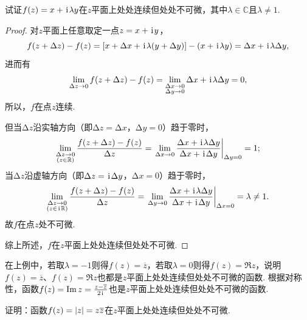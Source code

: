 \begin{example}
试证\(f(z)=x+\kern1pt\mathrm{i}\kern1pt \lambda y\)在\(z\)平面上处处连续但处处不可微，其中\(\lambda \in \mathbb{C}\)且\(\lambda \neq 1\).
\begin{proof}
对\(z\)平面上任意取定一点\(z=x+\kern1pt\mathrm{i}\kern1pt y\)，\begin{equation*}
f(z+\Delta z)-f(z) = [x + \Delta x + \kern1pt\mathrm{i}\kern1pt \lambda (y + \Delta y)] - (x + \kern1pt\mathrm{i}\kern1pt \lambda y) = \Delta x + \kern1pt\mathrm{i}\kern1pt \lambda \Delta y,
\end{equation*}进而有\begin{equation*}
\lim_{\Delta z\to0} f(z+\Delta z)-f(z)
= \lim_{\substack{\Delta x\to0 \\ \Delta y\to0}} \Delta x + \kern1pt\mathrm{i}\kern1pt \lambda \Delta y
= 0,
\end{equation*}所以，\(f\)在点\(z\)连续.

但当\(\increment z\)沿实轴方向（即\(\increment z = \increment x\)，\(\increment y = 0\)）趋于零时，\begin{equation*}
\lim_{\substack{\increment z\to0 \\ (z \in \mathbb{R})}} \frac{f(z+\increment z)-f(z)}{\increment z}
= \eval{\lim_{\increment x\to0} \frac{\increment x + \iu \lambda \increment y}{\increment x + \iu \increment y}}_{\increment y = 0} = 1;
\end{equation*}当\(\increment z\)沿虚轴方向（即\(\Delta z = \kern1pt\mathrm{i}\kern1pt \Delta y\)，\(\increment x = 0\)）趋于零时，\begin{equation*}
\lim_{\substack{\increment z\to0 \\ (z \in \iu \mathbb{R})}} \frac{f(z+\increment z)-f(z)}{\increment z}
= \eval{\lim_{\increment y\to0} \frac{\increment x + \iu \lambda \increment y}{\increment x + \iu \increment y}}_{\increment x = 0} = \lambda \neq 1.
\end{equation*}故\(f\)在点\(z\)处不可微.

综上所述，\(f\)在\(z\)平面上处处连续但处处不可微.
\end{proof}
\end{example}
在上例中，若取\(\lambda=-1\)则得\(f(z) = \overline{z}\)，若取\(\lambda=0\)则得\(f(z) = \Re z\)，说明\(f(z) = \overline{z}\)、\(f(z) = \Re z\)也都是\(z\)平面上处处连续但处处不可微的函数.
根据对称性，函数\(f(z) = \Im z = \frac{z - \overline{z}}{2\kern1pt\mathrm{i}\kern1pt}\)也是\(z\)平面上处处连续但处处不可微的函数.

\begin{example}
证明：函数\(f(z) = \abs{z} = z \overline{z}\)在\(z\)平面上处处连续但处处不可微.
\end{example}

